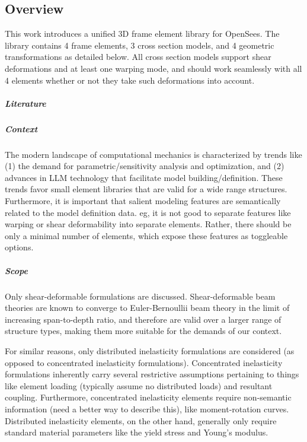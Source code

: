 \subsection{Overview}


This work introduces a unified 3D frame element library for OpenSees. 
The library contains 4 frame elements, 3 cross
section models, and 4 geometric transformations as detailed below. 
All cross section models support shear deformations and at least one
warping mode, and should work seamlessly with all 4 elements whether or not they take such deformations into account.


\subparagraph{Literature}
\cite{ngoc2017damage}

\subparagraph{Context}
The modern landscape of computational mechanics is characterized by trends like (1) the demand for parametric/sensitivity analysis and optimization, 
and (2) advances in LLM technology that facilitate model building/definition.
These trends favor small element libraries that are valid for a wide range structures. 
Furthermore, it is important that salient modeling features are semantically related to the model definition data. eg, it is not good to separate features like warping or shear deformability  into separate elements. Rather, there should be only a minimal number of elements, which expose these features as toggleable options. 


\subparagraph{Scope}
Only shear-deformable formulations are discussed. 
Shear-deformable beam theories are known to converge to Euler-Bernoullii beam theory in the limit of increasing span-to-depth ratio, and therefore are valid over a larger range of structure types, making them more suitable for the demands of our context.

For similar reasons, only distributed inelasticity formulations are considered (as opposed to concentrated inelasticity formulations). 
Concentrated inelasticity formulations inherently carry several restrictive assumptions pertaining to things like element loading (typically assume no distributed loads) and resultant coupling. 
Furthermore, concentrated inelasticity elements require non-semantic information (need a better way to describe this), like moment-rotation curves. Distributed inelasticity elements, on the other hand, generally only require standard material parameters like the yield stress and Young's modulus. 

